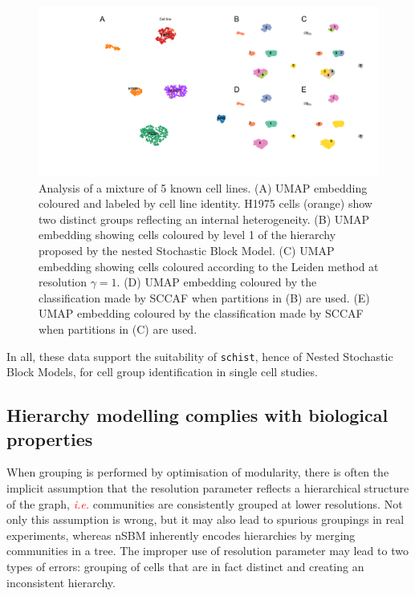 \documentclass[10pt]{article}
\begin{document}
\begin{figure}[H]
\centering
\includegraphics[keepaspectratio,width=1\textwidth,height=\textheight]{FigureTian.pdf}
\caption[]{Analysis of a mixture of 5 known cell lines. (A) UMAP embedding coloured and labeled by cell line identity. H1975 cells (orange) show two distinct groups reflecting an internal heterogeneity. (B) UMAP embedding showing cells coloured by level 1 of the hierarchy proposed by the nested Stochastic Block Model. (C) UMAP embedding showing cells coloured according to the Leiden method at resolution $\gamma = 1$. (D) UMAP embedding coloured by the classification made by SCCAF when partitions in (B) are used. (E) UMAP embedding coloured by the classification made by SCCAF when partitions in (C) are used.}\label{FigureTian}
\end{figure}

In all, these data support the suitability of \texttt{schist}, hence of Nested Stochastic Block Models, for cell group identification in single cell studies. 

\subsection*{Hierarchy modelling complies with biological properties}

When grouping is performed by optimisation of modularity, there is often the implicit assumption that the resolution parameter reflects a hierarchical structure of the graph, \textcolor{red}{\emph{i.e.}} communities are consistently grouped at lower resolutions. Not only this assumption is wrong, but it may also lead to spurious groupings in real experiments, whereas nSBM inherently encodes hierarchies by merging communities in a tree. The improper use of resolution parameter may lead to two types of errors: grouping of cells that are in fact distinct and creating an inconsistent hierarchy. 
\end{document}

